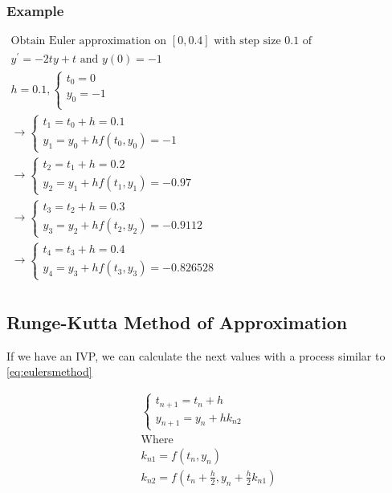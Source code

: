 \documentclass[12pt,landscape,twocolumn]{article}
\begin{document}
        \subsubsection{Example}
        $
        \begin{aligned}
        \text{Obtain Euler approximation on }[0, 0.4] \text{ with step size } 0.1 \text{ of}\\
        y^\prime = -2ty + t \text{ and } y(0) = -1\\
        h = 0.1, 
        \begin{cases}
        t_0 = 0\\
        y_0 = -1\\
        \end{cases} \\
        \to \begin{cases}
        t_1 = t_0 + h = 0.1\\
        y_1 = y_0 + h f(t_0, y_0) = -1
        \end{cases}\\
        \to \begin{cases}
        t_2 = t_1 + h = 0.2\\
        y_2 = y_1 + h f(t_1, y_1) = -0.97
        \end{cases}\\
        \to \begin{cases}
        t_3 = t_2 + h = 0.3\\
        y_3 = y_2 + h f(t_2, y_2) = -0.9112
        \end{cases}\\
        \to \begin{cases}
        t_4 = t_3 + h = 0.4\\
        y_4 = y_3 + h f(t_3, y_3) = -0.826528
        \end{cases}\\
        \end{aligned}
        $
    \subsection{Runge-Kutta Method of Approximation}
    If we have an IVP, we can calculate the next values with a process similar to \eqref{eq:eulersmethod}

    \begin{equation}\label{eq:2ork}
    \begin{aligned}
    \begin{cases}
    t_{n+1} = t_n + h\\
    y_{n+1} = y_n + h k_{n2}
    \end{cases}\\
    \text{Where}\\
    k_{n1} = f(t_n, y_n)\\
    k_{n2} = f \left( t_n + \frac{h}{2}, y_n + \frac{h}{2} k_{n1} \right)
    \end{aligned}
    \end{equation}
\end{document}
